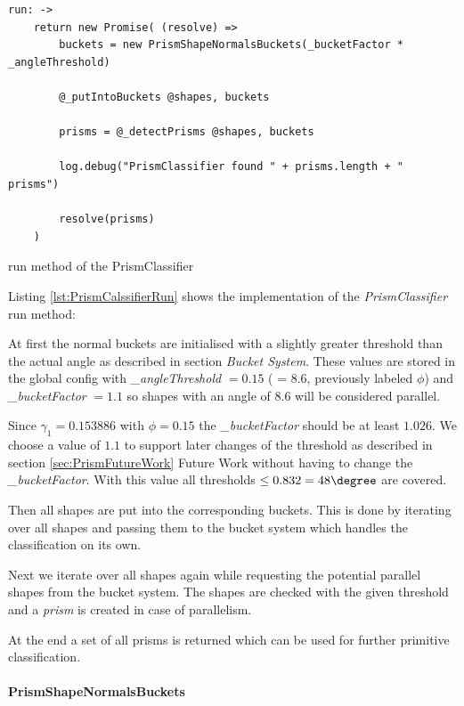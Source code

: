\documentclass[../ClassicThesis.tex]{subfiles}
\begin{document}
\begin{listing}[!h]
\centering
\begin{verbatim}
run: ->
    return new Promise( (resolve) =>
        buckets = new PrismShapeNormalsBuckets(_bucketFactor * _angleThreshold)

        @_putIntoBuckets @shapes, buckets
        
        prisms = @_detectPrisms @shapes, buckets
        
        log.debug("PrismClassifier found " + prisms.length + " prisms")
        
        resolve(prisms)
    )
\end{verbatim}
\caption{run method of the PrismClassifier}
\label{lst:PrismClassifierRun}
\end{listing}

Listing \ref{lst:PrismCalssifierRun} shows the implementation of the \emph{PrismClassifier} run method: 

At first the normal buckets are initialised with a slightly greater threshold than the actual angle as described in section \emph{Bucket System}. These values are stored in the global config with \emph{\_angleThreshold} $ = 0.15 $  ( = 8.6\textdegree, previously labeled $\phi$) and \emph{\_bucketFactor} $ = 1.1 $ so shapes with an angle  of 8.6\textdegree \hspace{1pt} will be considered parallel. 

Since $ {\gamma}_{1} = 0.153886 $ with $\phi = 0.15$ the \emph{\_bucketFactor} should be at least $1.026$. We choose a value of $1.1$ to support later changes of the threshold as described in section \ref{sec:PrismFutureWork} Future Work without having to change the \emph{\_bucketFactor}. With this value all thresholds $ \leq 0.832 = 48\degree$ are covered.

Then all shapes are put into the corresponding buckets. This is done by iterating over all shapes and passing them to the bucket system which handles the classification on its own.

Next we iterate over all shapes again while requesting the potential parallel shapes from the bucket system. The shapes are checked with the given threshold and a \emph{prism} is created in case of parallelism.

At the end a set of all prisms is returned which can be used for further primitive classification.


\paragraph{PrismShapeNormalsBuckets}
\end{document}
